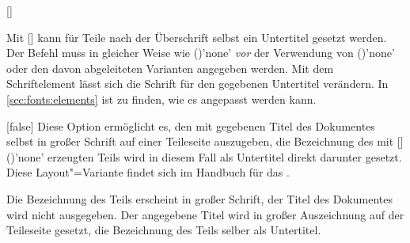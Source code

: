 \begin{Declaration*}{}
\begin{Declaration*}{}
\begin{Declaration*}{}
\begin{Declaration}[v2.06]{[]}
\begin{Declaration}[v2.06]{}
\printdeclarationlist%
%
%
%
%
Mit [] kann für Teile nach der 
Überschrift selbst ein Untertitel gesetzt werden. Der Befehl muss in gleicher 
Weise wie ()'none' \emph{vor} der 
Verwendung von ()'none' oder den davon 
abgeleiteten Varianten angegeben werden. Mit dem Schriftelement 
 lässt sich die Schrift für den gegebenen Untertitel 
verändern. In \autoref{sec:fonts:elements} ist zu finden, wie es angepasst 
werden kann.
\end{Declaration}
\end{Declaration}

\begin{Declaration}{}[false]%
\printdeclarationlist%
%
%
%
Diese Option ermöglicht es, den mit  gegebenen Titel des 
Dokumentes selbst in großer Schrift auf einer Teileseite auszugeben, die 
Bezeichnung des mit 
[]()'none' erzeugten 
Teils wird in diesem Fall als Untertitel direkt darunter gesetzt. Diese 
Layout"=Variante findet sich im Handbuch für das \TUDCD. \notudscrartcl
%
\begin{values}{}
\itemfalse
  Die Bezeichnung des Teils erscheint in großer Schrift, der Titel des 
  Dokumentes wird nicht ausgegeben.
\itemtrue*
  Der angegebene Titel wird in großer Auszeichnung auf der Teileseite gesetzt,
  die Bezeichnung des Teils selber als Untertitel.
\end{values}
\end{Declaration}




\end{Declaration*}
\end{Declaration*}
\end{Declaration*}

